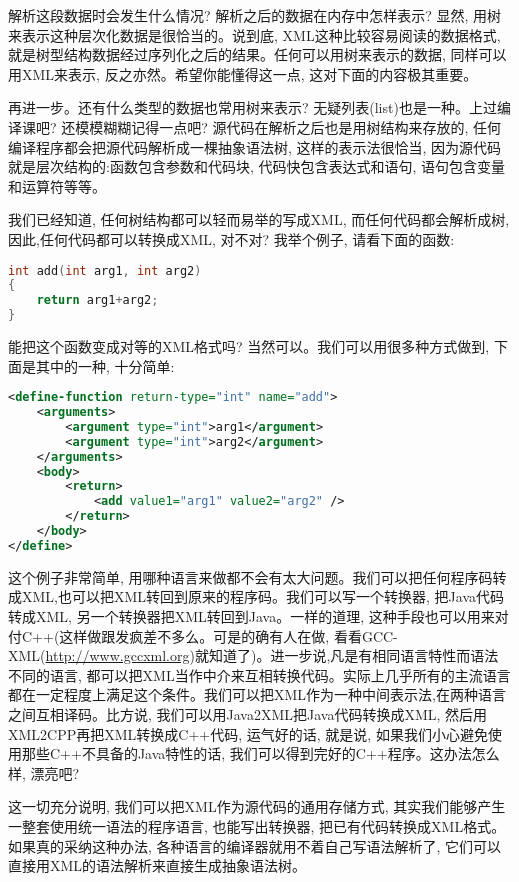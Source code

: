 \documentclass[10pt]{article}
\begin{document}
解析这段数据时会发生什么情况? 解析之后的数据在内存中怎样表示? 显然, 用树来表示这种层次化数据是很恰当的。说到底, XML这种比较容易阅读的数据格式, 就是树型结构数据经过序列化之后的结果。任何可以用树来表示的数据, 同样可以用XML来表示, 反之亦然。希望你能懂得这一点, 这对下面的内容极其重要。

再进一步。还有什么类型的数据也常用树来表示? 无疑列表(list)也是一种。上过编译课吧? 还模模糊糊记得一点吧? 源代码在解析之后也是用树结构来存放的, 任何编译程序都会把源代码解析成一棵抽象语法树, 这样的表示法很恰当, 因为源代码就是层次结构的:函数包含参数和代码块, 代码快包含表达式和语句, 语句包含变量和运算符等等。

我们已经知道, 任何树结构都可以轻而易举的写成XML, 而任何代码都会解析成树, 因此,任何代码都可以转换成XML, 对不对? 我举个例子, 请看下面的函数:
\begin{lstlisting}[language=c++]
int add(int arg1, int arg2)
{
    return arg1+arg2;
}
\end{lstlisting}

能把这个函数变成对等的XML格式吗? 当然可以。我们可以用很多种方式做到, 下面是其中的一种, 十分简单:
\begin{lstlisting}[language=xml]
<define-function return-type="int" name="add">
    <arguments>
        <argument type="int">arg1</argument>
        <argument type="int">arg2</argument>
    </arguments>
    <body>
        <return>
            <add value1="arg1" value2="arg2" />
        </return>
    </body>
</define>
\end{lstlisting}

这个例子非常简单, 用哪种语言来做都不会有太大问题。我们可以把任何程序码转成XML,也可以把XML转回到原来的程序码。我们可以写一个转换器, 把Java代码转成XML, 另一个转换器把XML转回到Java。一样的道理, 这种手段也可以用来对付C++(这样做跟发疯差不多么。可是的确有人在做, 看看GCC-XML(\url{http://www.gccxml.org})就知道了)。进一步说,凡是有相同语言特性而语法不同的语言, 都可以把XML当作中介来互相转换代码。实际上几乎所有的主流语言都在一定程度上满足这个条件。我们可以把XML作为一种中间表示法,在两种语言之间互相译码。比方说, 我们可以用Java2XML把Java代码转换成XML, 然后用XML2CPP再把XML转换成C++代码, 运气好的话, 就是说, 如果我们小心避免使用那些C++不具备的Java特性的话, 我们可以得到完好的C++程序。这办法怎么样, 漂亮吧?

这一切充分说明, 我们可以把XML作为源代码的通用存储方式, 其实我们能够产生一整套使用统一语法的程序语言, 也能写出转换器, 把已有代码转换成XML格式。如果真的采纳这种办法, 各种语言的编译器就用不着自己写语法解析了, 它们可以直接用XML的语法解析来直接生成抽象语法树。
\end{document}

